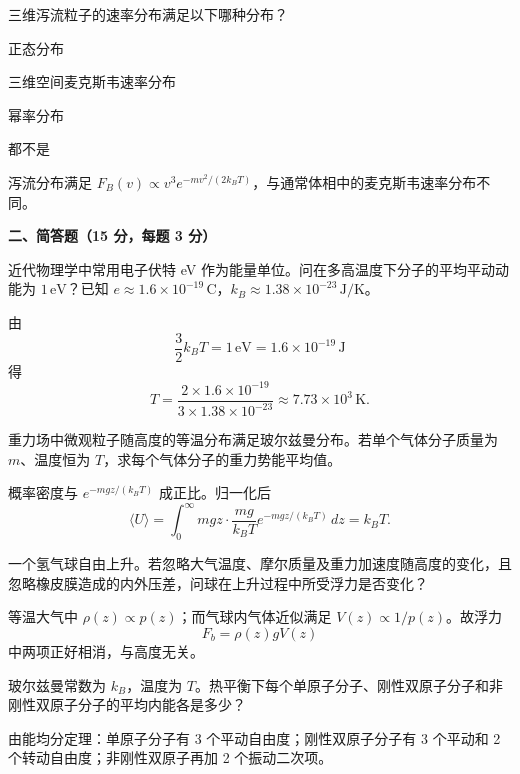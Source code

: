 \begin{question}
三维泻流粒子的速率分布满足以下哪种分布？
\begin{choiceoptions}
\item 正态分布
\item 三维空间麦克斯韦速率分布
\item 幂率分布
\item 都不是
\end{choiceoptions}
\begin{solution}
泻流分布满足 $F_B(v)\propto v^3e^{-mv^2/(2k_BT)}$，与通常体相中的麦克斯韦速率分布不同。
\end{solution}
\end{question}

\textbf{二、简答题（15 分，每题 3 分）}
\begin{question}
近代物理学中常用电子伏特 eV 作为能量单位。问在多高温度下分子的平均平动动能为 $1\,\mathrm{eV}$？已知 $e\approx1.6\times10^{-19}\,\mathrm{C}$，$k_B\approx1.38\times10^{-23}\,\mathrm{J/K}$。
\begin{solution}
由
\[
\frac32k_BT=1\,\mathrm{eV}=1.6\times10^{-19}\,\mathrm{J}
\]
得
\[
T=\frac{2\times1.6\times10^{-19}}{3\times1.38\times10^{-23}}\approx7.73\times10^3\,\mathrm{K}.
\]
\end{solution}
\end{question}

\begin{question}
重力场中微观粒子随高度的等温分布满足玻尔兹曼分布。若单个气体分子质量为 $m$、温度恒为 $T$，求每个气体分子的重力势能平均值。
\begin{solution}
概率密度与 $e^{-mgz/(k_BT)}$ 成正比。归一化后
\[
\langle U\rangle=\int_0^{\infty}mgz\cdot \frac{mg}{k_BT}e^{-mgz/(k_BT)}\,dz=k_BT.
\]
\end{solution}
\end{question}

\begin{question}
一个氢气球自由上升。若忽略大气温度、摩尔质量及重力加速度随高度的变化，且忽略橡皮膜造成的内外压差，问球在上升过程中所受浮力是否变化？
\begin{solution}
等温大气中 $\rho(z)\propto p(z)$；而气球内气体近似满足 $V(z)\propto1/p(z)$。故浮力
\[
F_b=\rho(z)gV(z)
\]
中两项正好相消，与高度无关。
\end{solution}
\end{question}

\begin{question}
玻尔兹曼常数为 $k_B$，温度为 $T$。热平衡下每个单原子分子、刚性双原子分子和非刚性双原子分子的平均内能各是多少？
\begin{solution}
由能均分定理：单原子分子有 3 个平动自由度；刚性双原子分子有 3 个平动和 2 个转动自由度；非刚性双原子再加 2 个振动二次项。
\end{solution}
\end{question}

